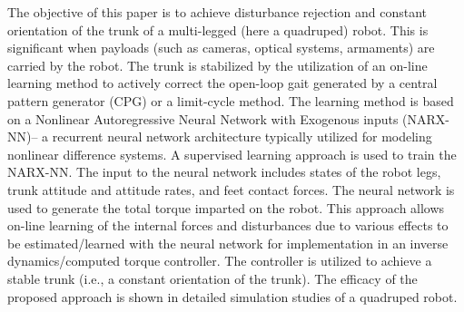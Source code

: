



The objective of this paper is to achieve disturbance rejection and 
constant orientation of the trunk of a multi-legged (here a quadruped) robot. This 
is significant when payloads (such as cameras, optical systems, armaments) are carried by the robot.  The trunk is stabilized 
by the utilization of an on-line learning method to actively correct the open-loop gait
generated by a central pattern generator (CPG) or a limit-cycle method. The learning method is based on
a Nonlinear Autoregressive Neural Network with Exogenous inputs (NARX-NN)-- a recurrent neural network architecture 
typically utilized for modeling nonlinear difference systems. A supervised learning approach is used to train the NARX-NN. The input
to the neural network includes states of the robot legs, trunk attitude and attitude rates, and feet contact forces. The  
neural network is used to generate the total torque imparted on the robot. 
This approach allows on-line learning of the internal forces and disturbances due
to various effects to be estimated/learned with the neural network for implementation in an inverse dynamics/computed torque 
controller. The controller is utilized to achieve a stable trunk (i.e., a constant orientation of the trunk). The efficacy of the
proposed approach is shown in detailed simulation studies of a quadruped robot. 
